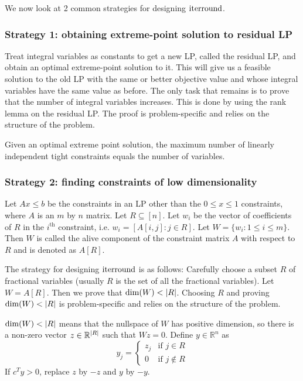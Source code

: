 We now look at 2 common strategies for designing $\operatorname{iterround}$.

\subsubsection{Strategy 1: obtaining extreme-point solution to residual LP}

Treat integral variables as constants to get a new LP, called the residual LP,
and obtain an optimal extreme-point solution to it.
This will give us a feasible solution to the old LP with the same or better
objective value and whose integral variables have the same value as before.
The only task that remains is to prove that the number of integral variables increases.
This is done by using the rank lemma on the residual LP.
The proof is problem-specific and relies on the structure of the problem.

\begin{theorem}
Given an optimal extreme point solution,
the maximum number of linearly independent tight constraints
equals the number of variables.
\end{theorem}

\subsubsection{Strategy 2: finding constraints of low dimensionality}
\label{sec:it-str-2}

\begin{definition}
Let $Ax \le b$ be the constraints in an LP other than the $0 \le x \le 1$ constraints,
where $A$ is an $m$ by $n$ matrix. Let $R \subseteq [n]$.
Let $w_i$ be the vector of coefficients of $R$ in the $i^{\textrm{th}}$ constraint,
i.e. $w_i = [A[i, j]: j \in R]$. Let $W = \{w_i: 1 \le i \le m\}$.
Then $W$ is called the alive component of the constraint matrix
$A$ with respect to $R$ and is denoted as $A[R]$.
\end{definition}

The strategy for designing $\operatorname{iterround}$ is as follows:
Carefully choose a subset $R$ of fractional variables
(usually $R$ is the set of all the fractional variables).
Let $W = A[R]$. Then we prove that $\dim(W) < \left\lvert R \right\rvert$.
Choosing $R$ and proving $\dim(W) < \left\lvert R \right\rvert$ is problem-specific
and relies on the structure of the problem.

$\dim(W) < \left\lvert R \right\rvert$ means that the nullspace of $W$ has positive dimension,
so there is a non-zero vector $z \in \mathbb{R}^{\left\lvert R \right\rvert}$ such that $Wz = 0$.
Define $y \in \mathbb{R}^n$ as
\[ y_j = \begin{cases} z_j & \textrm{if } j \in R
\\ 0 & \textrm{if } j \not\in R \end{cases} \]
If $c^Ty > 0$, replace $z$ by $-z$ and $y$ by $-y$.

